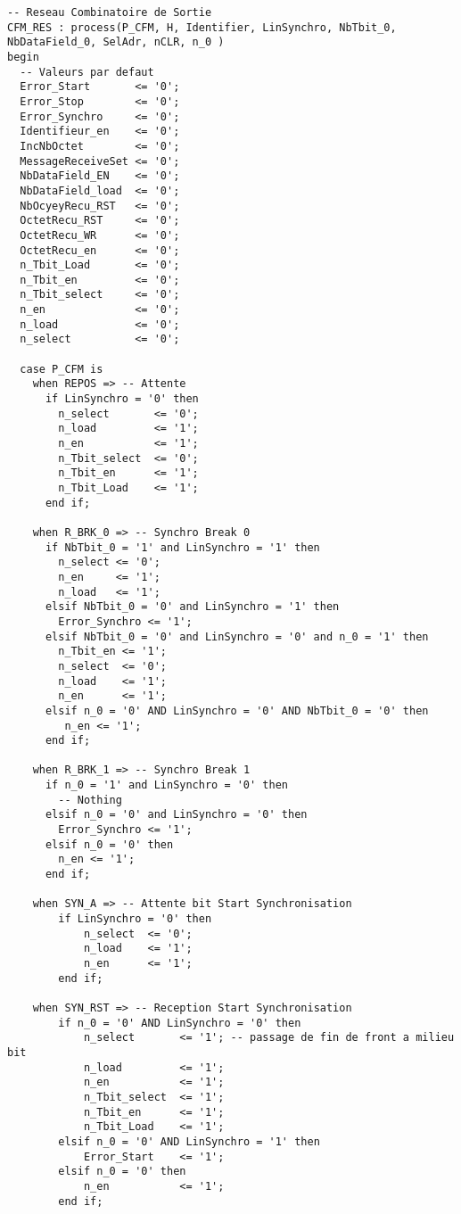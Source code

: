 \begin{lstlisting}[style=VHDLStyle, caption={Réseau Combinatoire de Sortie Reception Trame}]
  -- Reseau Combinatoire de Sortie
CFM_RES : process(P_CFM, H, Identifier, LinSynchro, NbTbit_0, NbDataField_0, SelAdr, nCLR, n_0 )
begin
  -- Valeurs par defaut
  Error_Start       <= '0';
  Error_Stop        <= '0';
  Error_Synchro     <= '0';
  Identifieur_en    <= '0';
  IncNbOctet        <= '0';
  MessageReceiveSet <= '0';
  NbDataField_EN    <= '0';
  NbDataField_load  <= '0';
  NbOcyeyRecu_RST   <= '0';
  OctetRecu_RST     <= '0';
  OctetRecu_WR      <= '0';
  OctetRecu_en      <= '0';
  n_Tbit_Load       <= '0';
  n_Tbit_en         <= '0';
  n_Tbit_select     <= '0';
  n_en              <= '0';
  n_load            <= '0';
  n_select          <= '0';

  case P_CFM is 
    when REPOS => -- Attente
      if LinSynchro = '0' then 
        n_select       <= '0';
        n_load         <= '1';
        n_en           <= '1';
        n_Tbit_select  <= '0';
        n_Tbit_en      <= '1';
        n_Tbit_Load    <= '1';
      end if;

    when R_BRK_0 => -- Synchro Break 0
      if NbTbit_0 = '1' and LinSynchro = '1' then
        n_select <= '0';
        n_en     <= '1';
        n_load   <= '1';
      elsif NbTbit_0 = '0' and LinSynchro = '1' then
        Error_Synchro <= '1';
      elsif NbTbit_0 = '0' and LinSynchro = '0' and n_0 = '1' then
        n_Tbit_en <= '1';
        n_select  <= '0';
        n_load    <= '1';
        n_en      <= '1';
      elsif n_0 = '0' AND LinSynchro = '0' AND NbTbit_0 = '0' then 
         n_en <= '1';
      end if;

    when R_BRK_1 => -- Synchro Break 1 
      if n_0 = '1' and LinSynchro = '0' then
        -- Nothing
      elsif n_0 = '0' and LinSynchro = '0' then
        Error_Synchro <= '1';
      elsif n_0 = '0' then
        n_en <= '1';
      end if;
      
    when SYN_A => -- Attente bit Start Synchronisation
        if LinSynchro = '0' then
            n_select  <= '0';
            n_load    <= '1';
            n_en      <= '1';
        end if;
        
    when SYN_RST => -- Reception Start Synchronisation
        if n_0 = '0' AND LinSynchro = '0' then
            n_select       <= '1'; -- passage de fin de front a milieu bit
            n_load         <= '1';
            n_en           <= '1';
            n_Tbit_select  <= '1';
            n_Tbit_en      <= '1';
            n_Tbit_Load    <= '1';
        elsif n_0 = '0' AND LinSynchro = '1' then
            Error_Start    <= '1';
        elsif n_0 = '0' then
            n_en           <= '1';
        end if;
        

\end{lstlisting}
